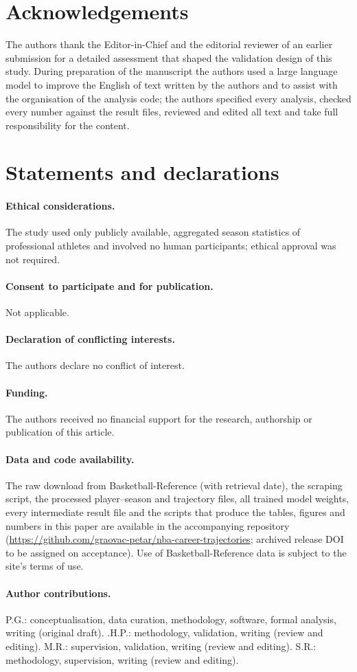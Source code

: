 \section*{Acknowledgements}
The authors thank the Editor-in-Chief and the editorial reviewer of an earlier submission for a detailed assessment that shaped the validation design of this study. During preparation of the manuscript the authors used a large language model to improve the English of text written by the authors and to assist with the organisation of the analysis code; the authors specified every analysis, checked every number against the result files, reviewed and edited all text and take full responsibility for the content.

\section*{Statements and declarations}
\paragraph{Ethical considerations.} The study used only publicly available, aggregated season statistics of professional athletes and involved no human participants; ethical approval was not required.
\paragraph{Consent to participate and for publication.} Not applicable.
\paragraph{Declaration of conflicting interests.} The authors declare no conflict of interest.
\paragraph{Funding.} The authors received no financial support for the research, authorship or publication of this article.
\paragraph{Data and code availability.} The raw download from Basketball-Reference (with retrieval date), the scraping script, the processed player--season and trajectory files, all trained model weights, every intermediate result file and the scripts that produce the tables, figures and numbers in this paper are available in the accompanying repository (\url{https://github.com/graovac-petar/nba-career-trajectories}; archived release DOI to be assigned on acceptance). Use of Basketball-Reference data is subject to the site's terms of use.
\paragraph{Author contributions.} P.G.: conceptualisation, data curation, methodology, software, formal analysis, writing (original draft). \DJ.H.P.: methodology, validation, writing (review and editing). M.R.: supervision, validation, writing (review and editing). S.R.: methodology, supervision, writing (review and editing).

